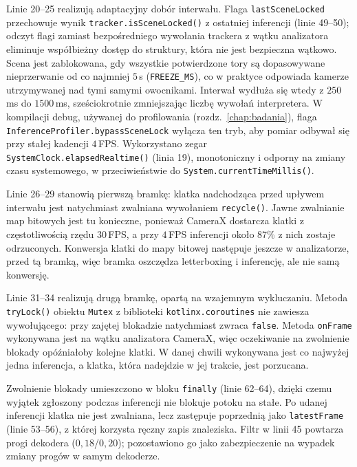 Linie 20--25 realizują adaptacyjny dobór interwału. Flaga \texttt{lastSceneLocked} przechowuje wynik \texttt{tracker.isSceneLocked()} z ostatniej inferencji (linie 49--50); odczyt flagi zamiast bezpośredniego wywołania trackera z wątku analizatora eliminuje współbieżny dostęp do struktury, która nie jest bezpieczna wątkowo. Scena jest zablokowana, gdy wszystkie potwierdzone tory są dopasowywane nieprzerwanie od co najmniej $5$\,s (\texttt{FREEZE\_MS}), co w praktyce odpowiada kamerze utrzymywanej nad tymi samymi owocnikami. Interwał wydłuża się wtedy z $250$\,ms do $1500$\,ms, sześciokrotnie zmniejszając liczbę wywołań interpretera. W kompilacji debug, używanej do profilowania (rozdz.~\ref{chap:badania}), flaga \texttt{InferenceProfiler.bypassSceneLock} wyłącza ten tryb, aby pomiar odbywał się przy stałej kadencji $4$\,FPS. Wykorzystano zegar \texttt{SystemClock.elapsedRealtime()} (linia 19), monotoniczny i odporny na zmiany czasu systemowego, w przeciwieństwie do \texttt{System.currentTimeMillis()}.

Linie 26--29 stanowią pierwszą bramkę: klatka nadchodząca przed upływem interwału jest natychmiast zwalniana wywołaniem \texttt{recycle()}. Jawne zwalnianie map bitowych jest tu konieczne, ponieważ CameraX dostarcza klatki z częstotliwością rzędu $30$\,FPS, a przy $4$\,FPS inferencji około $87\%$ z nich zostaje odrzuconych. Konwersja klatki do mapy bitowej następuje jeszcze w analizatorze, przed tą bramką, więc bramka oszczędza letterboxing i inferencję, ale nie samą konwersję.

Linie 31--34 realizują drugą bramkę, opartą na wzajemnym wykluczaniu. Metoda \texttt{tryLock()} obiektu \texttt{Mutex} z biblioteki \texttt{kotlinx.coroutines} nie zawiesza wywołującego: przy zajętej blokadzie natychmiast zwraca \texttt{false}. Metoda \texttt{onFrame} wykonywana jest na wątku analizatora CameraX, więc oczekiwanie na zwolnienie blokady opóźniałoby kolejne klatki. W danej chwili wykonywana jest co najwyżej jedna inferencja, a klatka, która nadejdzie w jej trakcie, jest porzucana.

Zwolnienie blokady umieszczono w bloku \texttt{finally} (linie 62--64), dzięki czemu wyjątek zgłoszony podczas inferencji nie blokuje potoku na stałe. Po udanej inferencji klatka nie jest zwalniana, lecz zastępuje poprzednią jako \texttt{latestFrame} (linie 53--56), z której korzysta ręczny zapis znaleziska. Filtr w linii 45 powtarza progi dekodera ($0{,}18$/$0{,}20$); pozostawiono go jako zabezpieczenie na wypadek zmiany progów w samym dekoderze.

